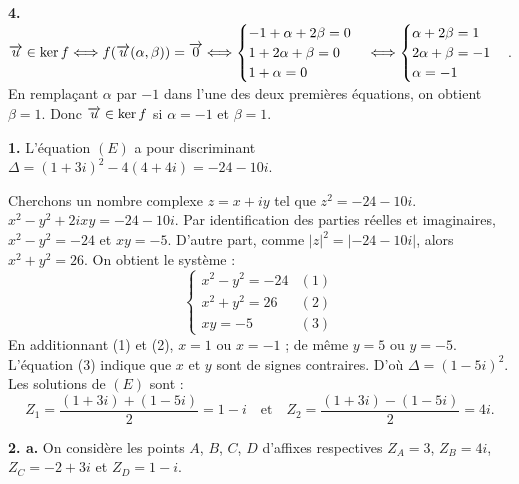 \documentclass[11pt]{article}
\begin{document}
\textbf{4.} $\overrightarrow{u} \in \ker f \Longleftrightarrow f(\overrightarrow{u}(\alpha, \beta)) = \overrightarrow{0} \Longleftrightarrow \begin{cases} -1 + \alpha + 2\beta = 0 \\ 1 + 2\alpha + \beta = 0 \\ 1 + \alpha = 0 \end{cases} \Longleftrightarrow \begin{cases} \alpha + 2\beta = 1 \\ 2\alpha + \beta = -1 \\ \alpha = -1 \end{cases}$. En remplaçant $\alpha$ par $-1$ dans l'une des deux premières équations, on obtient $\beta = 1$. Donc $\overrightarrow{u} \in \ker f$ si $\alpha = -1$ et $\beta = 1$.


\textbf{1.} L'équation $(E)$ a pour discriminant $\Delta = (1 + 3i)^2 - 4(4 + 4i) = -24 - 10i$.

Cherchons un nombre complexe $z = x + iy$ tel que $z^2 = -24 - 10i$. $x^2 - y^2 + 2ixy = -24 - 10i$. Par identification des parties réelles et imaginaires, $x^2 - y^2 = -24$ et $xy = -5$. D'autre part, comme $|z|^2 = |-24 - 10i|$, alors $x^2 + y^2 = 26$. On obtient le système :
\[ \begin{cases} x^2 - y^2 = -24 & (1) \\ x^2 + y^2 = 26 & (2) \\ xy = -5 & (3) \end{cases} \]
En additionnant (1) et (2), $x = 1$ ou $x = -1$ ; de même $y = 5$ ou $y = -5$. L'équation (3) indique que $x$ et $y$ sont de signes contraires. D'où $\Delta = (1 - 5i)^2$. Les solutions de $(E)$ sont :
\[ Z_1 = \frac{(1 + 3i) + (1 - 5i)}{2} = 1 - i \quad \text{et} \quad Z_2 = \frac{(1 + 3i) - (1 - 5i)}{2} = 4i. \]

\textbf{2. a.} On considère les points $A$, $B$, $C$, $D$ d'affixes respectives $Z_A = 3$, $Z_B = 4i$, $Z_C = -2 + 3i$ et $Z_D = 1 - i$.
\begin{center}
\end{center}
\end{document}
